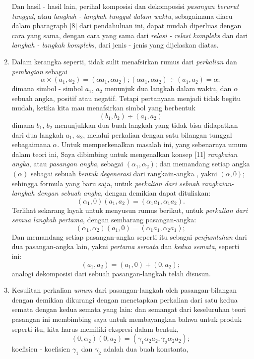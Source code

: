 \documentclass[a4paper, 12pt]{book}
\begin{document}
\begin{enumerate}
Dan hasil - hasil lain, perihal komposisi dan dekomposisi 
\textit{pasangan berurut tunggal}, atau \textit{langkah - langkah tunggal 
dalam waktu}, sebagaimana diacu dalam pharagraph [8] dari pendahuluan ini, 
dapat mudah diperluas dengan cara yang sama, dengan cara yang sama dari 
\textit{relasi - relasi kompleks} dan dari \textit{langkah - langkah kompleks}, 
dari jenis - jenis yang dijelaskan diatas.
\item Dalam kerangka seperti, tidak sulit menafsirkan rumus dari 
\textit{perkalian} dan \textit{pembagian} sebagai
\[
\alpha \times (a_1, a_2) = (\alpha a_1, \alpha a_2); (\alpha a_1, \alpha a_2) \div (a_1, a_2) = \alpha;
\]
dimana simbol - simbol $a_1$, $a_2$ menunjuk dua langkah dalam waktu, dan
$\alpha$ sebuah angka, positif atau negatif. Tetapi pertanyaan menjadi tidak
begitu mudah, ketika kita mau menafsirkan simbol yang berbentuk
\[
(b_1, b_2) \div (a_1, a_2)
\]
dimana $b_1$, $b_2$ menunjukkan dua buah langkah yang tidak bisa didapatkan
dari dua langkah $a_1$, $a_2$, melalui perkalian dengan satu bilangan tunggal
sebagaimana $\alpha$. Untuk memperkenalkan masalah ini, yang sebenarnya umum dalam
teori ini, Saya dibimbing untuk mengenalkan konsep [11] 
\textit{rangkaian angka}, atau \textit{pasangan angka}, sebagai $(\alpha_1, \alpha_2)$; 
dan memandang setiap angka $(\alpha)$ sebagai  sebuah \textit{bentuk degenerasi} 
dari rangkain-angka , yakni $(\alpha, 0)$; sehingga formula yang baru saja, untuk
\textit{perkalian dari sebuah rangkaian-langkah dengan sebuah angka}, dengan 
demikian dapat dituliskan:
\[
(\alpha_1, 0)(a_1, a_2) = (\alpha_1 a_1, \alpha_1  a_2).
\]
Terlihat sekarang layak untuk menyusun rumus berikut, untuk 
\textit{perkalian dari semua langkah pertama}, dengan sembarang pasangan-angka:
\[
(\alpha_1, \alpha_2)(a_1, 0) = (\alpha_1a_1, \alpha_2 a_1);
\]
Dan memandang setiap pasangan-angka seperti itu sebagai \textit{penjumlahan} dari
dua pasangan-angka lain, yakni \textit{pertama semata} dan \textit{kedua semata},
seperti ini:
\[
(a_1, a_2) = (a_1, 0) + (0, a_2);
\]
analogi dekomposisi dari sebuah pasangan-langkah telah disusun.
\item Kesulitan perkalian \textit{umum} dari pasangan-langkah oleh 
pasangan-bilangan dengan demikian dikurangi dengan menetapkan perkalian 
dari satu kedua semata dengan kedua semata yang lain: dan semangat dari
keseluruhan teori pasangan ini membimbing saya untuk membayangkan bahwa
untuk produk seperti itu, kita harus memiliki ekspresi dalam bentuk,
\[
(0, \alpha_2) (0, a_2) = (\gamma_1\alpha_2a_2, \gamma_2\alpha_2a_2);
\]
koefisien - koefisien $\gamma_1$ dan $\gamma_2$ adalah dua buah konstanta, 

\end{enumerate}
\end{document}
